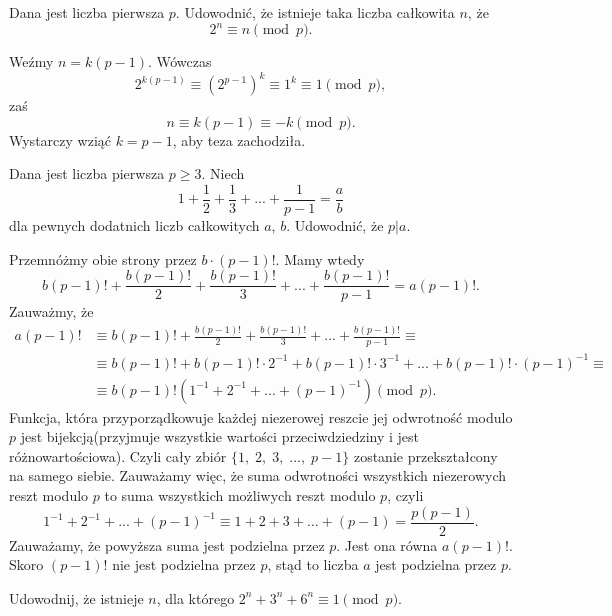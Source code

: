 \newpage
{}

\begin{problem}{1} 
	Dana jest liczba pierwsza $p$. Udowodnić, że istnieje taka liczba całkowita $n$, że 
	\[
		2^n \equiv n \pmod{p}.
	\]
\end{problem}

\noindent
Weźmy $n = k(p - 1)$. Wówczas 
\[
	2^{k(p-1)}\equiv (2^{p-1})^k \equiv 1^k \equiv 1 \pmod{p},
\]
zaś
\[
	n \equiv k(p - 1) \equiv -k \pmod{p}.
\]
Wystarczy wziąć $k = p - 1$, aby teza zachodziła.\\

\begin{problem}{2}
	Dana jest liczba pierwsza $p\geqslant 3$. Niech 
	\[
		1 + \frac{1}{2} + \frac{1}{3} + ... + \frac{1}{p-1} = \frac{a}{b}
	\]
	dla pewnych dodatnich liczb całkowitych $a$, $b$.
	Udowodnić, że $p\big| a$.
\end{problem}

\noindent
Przemnóżmy obie strony przez $b \cdot (p - 1)!$. Mamy wtedy 
\[
	b(p - 1)! + \frac{b(p - 1)!}{2} + \frac{b(p - 1)!}{3} + ...+\frac{b(p - 1)!}{p-1} = a(p - 1)!.
\] 
Zauważmy, że
\begin{align*}
	a(p - 1)! &\equiv b(p - 1)! + \frac{b(p - 1)!}{2} + \frac{b(p - 1)!}{3} + ...+\frac{b(p - 1)!}{p-1} \equiv \\
	&\equiv b(p - 1)! + b(p - 1)! \cdot 2^{-1} + b(p - 1)! \cdot 3^{-1} + ... + b(p - 1)!  \cdot (p - 1)^{-1} \equiv \\
	&\equiv b(p - 1)!(1^{-1}+2^{-1}+...+(p-1)^{-1}) \pmod{p}.
\end{align*}
Funkcja, która przyporządkowuje każdej niezerowej reszcie jej odwrotność modulo $p$ jest bijekcją(przyjmuje wszystkie wartości przeciwdziedziny i jest różnowartościowa). Czyli cały zbiór $\{1,\; 2,\; 3,\; ...,\; p-1\}$ zostanie przekształcony na samego siebie.
Zauważamy więc, że suma odwrotności wszystkich niezerowych reszt modulo $p$ to suma wszystkich możliwych reszt modulo $p$, czyli 
\[
	1^{-1} + 2^{-1} + ... + (p-1)^{-1} \equiv 1 + 2 + 3 + ... + (p-1) = \frac{p(p-1)}{2}.
\] Zauważamy, że powyższa suma jest podzielna przez $p$. Jest ona równa $a(p - 1)!$. Skoro $(p - 1)!$ nie jest podzielna przez $p$, stąd to liczba $a$ jest podzielna przez $p$.

\begin{problem}{3}
	Udowodnij, że istnieje $n$, dla którego $2^n+3^n+6^n\equiv 1 \pmod{p}.$
\end{problem}

